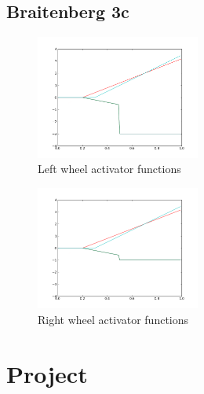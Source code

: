 \documentclass[a4paper]{article}
\begin{document}
\subsection{Braitenberg 3c}

\begin{figure}
	\begin{center}
		\includegraphics[width=0.48\textwidth]{graphs/activators/3c_l.png}
	\end{center}
	\caption{Left wheel activator functions}
\end{figure}

\begin{figure}
	\begin{center}
		\includegraphics[width=0.48\textwidth]{graphs/activators/3c_r.png}
	\end{center}
	\caption{Right wheel activator functions}
\end{figure}

\cleardoublepage
\section{Project}
\end{document}
